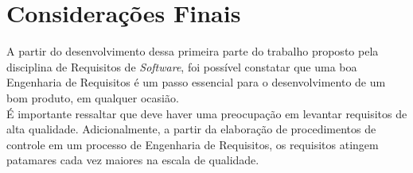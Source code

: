 \chapter[Considerações Finais]{Considerações Finais}
\label{chap:consideracoes}
	A partir do desenvolvimento dessa primeira parte do trabalho proposto pela disciplina de Requisitos de \emph{Software}, foi possível constatar que uma boa Engenharia de Requisitos é um passo essencial para o desenvolvimento de um bom produto, em qualquer ocasião.
	\\ \indent É importante ressaltar que deve haver uma preocupação em levantar requisitos de alta qualidade. Adicionalmente, a partir da elaboração de procedimentos de controle em um processo de Engenharia de Requisitos, os requisitos atingem patamares cada vez maiores na escala de qualidade.